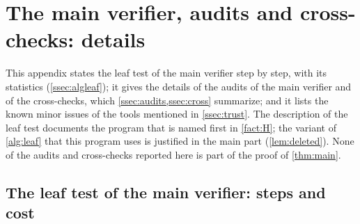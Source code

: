 \section{The main verifier, audits and cross-checks: details}\label{sec:supp-checks}

This appendix states the leaf test of the main verifier step by step, with its statistics
(\cref{ssec:algleaf}); it gives the details of the audits of the main verifier and of the cross-checks,
which \cref{ssec:audits,ssec:cross} summarize; and it lists the known minor issues of the tools mentioned
in \cref{ssec:trust}. The description of the leaf test documents the program that is named first in
\cref{fact:H}; the variant of \cref{alg:leaf} that this program uses is justified in the main part
(\cref{lem:deleted}). None of the audits and cross-checks reported here is part of the proof of
\cref{thm:main}.

\subsection{The leaf test of the main verifier: steps and cost}\label{ssec:supp-mainleaf}

